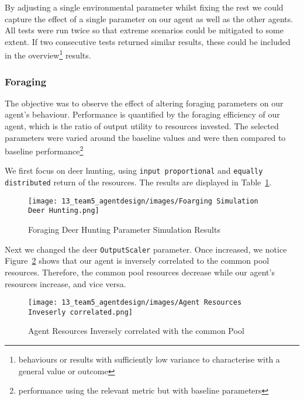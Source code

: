 By adjusting a single environmental parameter whilst fixing the rest we could capture the effect of a single parameter on our agent as well as the other agents. All tests were run twice so that extreme scenarios could be mitigated to some extent. If two consecutive tests returned similar results, these could be included in the overview\footnote{behaviours or results with sufficiently low variance to characterise with a general value or outcome} results.


\subsubsection{Foraging}

The objective was to observe the effect of altering foraging parameters on our agent's behaviour. Performance is quantified by the foraging efficiency of our agent, which is the ratio of output utility to resources invested. The selected parameters were varied around the baseline values and were then compared to baseline performance\footnote{performance using the relevant metric but with baseline parameters}

We first focus on deer hunting, using  \texttt{input proportional} and \texttt{equally distributed} return of the resources. The results are displayed in Table~\ref{fig:Foraging Deer Hunting Parameter Simulation Results}.

\begin{figure} [!htb]
    \centering
    \texttt{[image: 13\_team5\_agentdesign/images/Foarging Simulation Deer Hunting.png]}
    \caption{Foraging Deer Hunting Parameter Simulation Results}
    \label{fig:Foraging Deer Hunting Parameter Simulation Results}
\end{figure}

Next we changed the deer \texttt{OutputScaler} parameter. Once increased, we notice Figure~\ref{fig:Agent Resources Inversely correlated with the common Pool} shows that our agent is inversely correlated to the common pool resources. Therefore, the common pool resources decrease while our agent's resources increase, and vice versa.

\begin{figure}[!htb]
    \centering
    \texttt{[image: 13\_team5\_agentdesign/images/Agent Resources Inveserly correlated.png]}
    \caption{Agent Resources Inversely correlated with the common Pool}
    \label{fig:Agent Resources Inversely correlated with the common Pool}
\end{figure}


